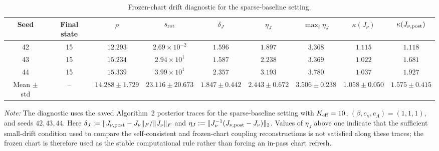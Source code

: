 \begin{table}[t]
\caption{Frozen-chart drift diagnostic for the sparse-baseline setting.}
\label{tab:supp_chart_drift_diagnostic}
\centering
\scriptsize
\setlength{\tabcolsep}{4pt}
\renewcommand{\arraystretch}{1.08}
\begin{tabular}{c c c c c c c c c}
\toprule
Seed & Final state & \(\rho\) & \(s_{\rm rot}\) & \(\delta_J\) & \(\eta_J\) & \(\max_t\eta_J\) & \(\kappa(J_\nu)\) & \(\kappa(J_{\nu,\rm post})\) \\
\midrule
42 & 15 & \(12.293\) & \(2.69{\times}10^{-2}\) & \(1.596\) & \(1.897\) & \(3.368\) & \(1.115\) & \(1.118\) \\
43 & 15 & \(15.234\) & \(2.94{\times}10^{1}\) & \(1.587\) & \(2.238\) & \(3.369\) & \(1.022\) & \(1.681\) \\
44 & 15 & \(15.339\) & \(3.99{\times}10^{1}\) & \(2.357\) & \(3.193\) & \(3.780\) & \(1.037\) & \(1.927\) \\
\midrule
Mean \(\pm\) std & -- & \(14.288\pm1.729\) & \(23.116\pm20.673\) & \(1.847\pm0.442\) & \(2.443\pm0.672\) & \(3.506\pm0.238\) & \(1.058\pm0.050\) & \(1.575\pm0.415\) \\
\bottomrule
\end{tabular}
\vspace{0.5ex}
\begin{minipage}{0.98\textwidth}
\footnotesize
\emph{Note:} The diagnostic uses the saved Algorithm~2 posterior traces for the sparse-baseline setting with \(K_{\rm eff}=10\), \((\beta,c_\kappa,c_\Lambda)=(1,1,1)\), and seeds \(42,43,44\). Here \(\delta_J:=\|J_{\nu,\rm post}-J_\nu\|_F/\|J_\nu\|_F\) and \(\eta_J:=\|J_\nu^{-1}(J_{\nu,\rm post}-J_\nu)\|_2\). Values of \(\eta_J\) above one indicate that the sufficient small-drift condition used to compare the self-consistent and frozen-chart coupling reconstructions is not satisfied along these traces; the frozen chart is therefore used as the stable computational rule rather than forcing an in-pass chart refresh.
\end{minipage}
\end{table}
